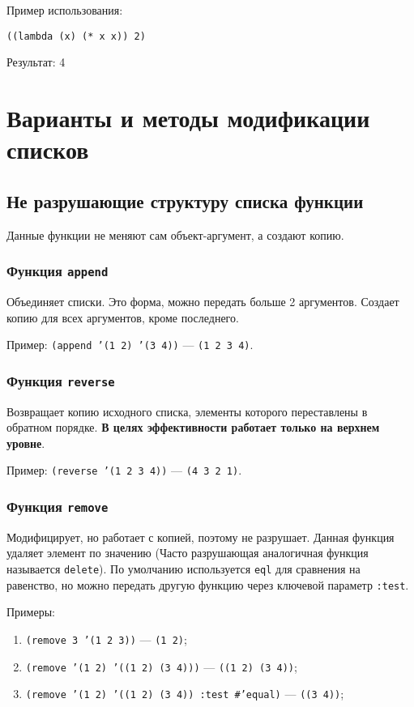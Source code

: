 Пример использования:
\begin{lstlisting}
((lambda (x) (* x x)) 2)
\end{lstlisting}
Результат: 4

\section{Варианты и методы модификации списков}

\subsection{Не разрушающие структуру списка функции}

Данные функции не меняют сам объект-аргумент, а создают копию.

\subsubsection{Функция \texttt{append}}

Объединяет списки. Это форма, можно передать больше 2 аргументов. Создает копию для всех аргументов, кроме последнего.

Пример: \texttt{(append '(1 2) '(3 4))} --- \texttt{(1 2 3 4)}.

\subsubsection{Функция \texttt{reverse}}

Возвращает копию исходного списка, элементы которого переставлены в обратном порядке. \textbf{В целях эффективности работает только на верхнем уровне}.

Пример: \texttt{(reverse '(1 2 3 4))} --- \texttt{(4 3 2 1)}.

\subsubsection{Функция \texttt{remove}}

Модифицирует, но работает с копией, поэтому не разрушает. Данная функция удаляет элемент по значению (Часто разрушающая аналогичная функция называется \texttt{delete}). По умолчанию используется \texttt{eql} для сравнения на равенство, но можно передать другую функцию через ключевой параметр \texttt{:test}.

Примеры: 
\begin{enumerate}
    \item \texttt{(remove 3 '(1 2 3))} --- \texttt{(1 2)};
    \item \texttt{(remove '(1 2) '((1 2) (3 4)))} --- \texttt{((1 2) (3 4))};
    \item \texttt{(remove '(1 2) '((1 2) (3 4)) :test #'equal)} --- \texttt{((3 4))};
\end{enumerate}

